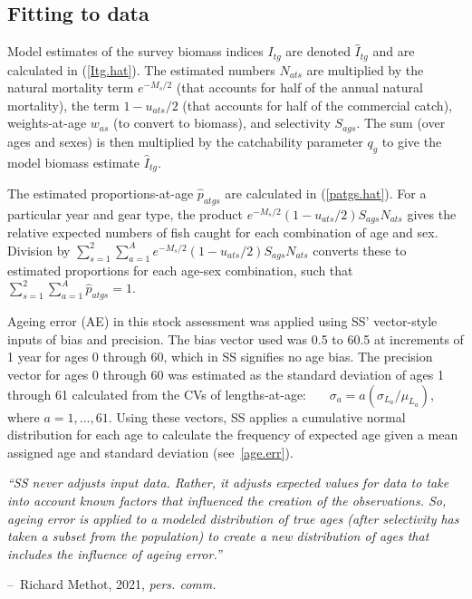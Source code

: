 \documentclass[11pt]{book}
\makeatletter
\newcommand{\comment}[1]{}                    %
\newenvironment{chapquote}[2][2em]
  {\setlength{\@tempdima}{#1}%
   \def\chapquote@author{#2}%
   \parshape 1 \@tempdima \dimexpr\textwidth-2\@tempdima\relax%
   \itshape}
  {\par\normalfont\hfill--\ \chapquote@author\hspace*{\@tempdima}\par\smallskip}
\newcommand{\eref}[1]{(\ref{#1})}
\makeatother
\begin{document}
\subsection{Fitting to data}

Model estimates of the survey biomass indices $I_{tg}$ are denoted $\widehat{I}_{tg}$ and are calculated in \eref{Itg.hat}.
The estimated numbers $N_{ats}$ are multiplied by the natural mortality term $e^{-M_s / 2}$ (that accounts for half of the annual natural mortality), the term $1 - u_{ats} / 2$ (that accounts for half of the commercial catch),  weights-at-age $w_{as}$ (to convert to biomass), and selectivity $S_{ags}$. 
The sum (over ages and sexes) is then multiplied by the catchability parameter $q_g$ to give the model biomass estimate $\widehat{I}_{tg}$. 
\comment{
}

The estimated proportions-at-age $\widehat{p}_{atgs}$ are calculated in \eref{patgs.hat}. 
For a particular year and gear type, the product $e^{-M_{s}/2} (1 - u_{ats}/2) S_{ags} N_{ats}$ gives the relative expected numbers of fish caught for each combination of age and sex. 
Division by $\sum_{s=1}^2 \sum_{a=1}^A e^{-M_{s}/2} (1 - u_{ats}/2) S_{ags} N_{ats}$ converts these to estimated proportions for each age-sex combination, such that $\sum_{s=1}^2 \sum_{a=1}^{A} \widehat{p}_{atgs} = 1$.

Ageing error (AE) in this stock assessment was applied using SS' vector-style inputs of bias and precision.
The bias vector used was 0.5 to 60.5 at increments of 1 year for ages 0 through 60, which in SS signifies no age bias.
The precision vector for ages 0 through 60 was estimated as the standard deviation of ages 1 through 61 calculated from the CVs of lengths-at-age:
~~~$\sigma_a = a (\sigma_{L_a} / \mu_{L_a})$, where $a=1,...,61$.
Using these vectors, SS applies a cumulative normal distribution for each age to calculate the frequency of expected age given a mean assigned age and standard deviation (see~\ref{age.err}).

\begin{chapquote}{Richard Methot, 2021, \textit{pers. comm.}}
``SS never adjusts input data.  Rather, it adjusts expected values for data to take into account known factors that influenced the creation of the observations. So, ageing error is applied to a modeled distribution of true ages (after selectivity has taken a subset from the population) to create a new distribution of ages that includes the influence of ageing error.''
\end{chapquote}
\end{document}
